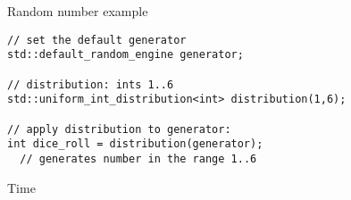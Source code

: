 \begin{block}{Random number example}
  \label{sl:stl:rand16}
\begin{lstlisting}
// set the default generator
std::default_random_engine generator;

// distribution: ints 1..6
std::uniform_int_distribution<int> distribution(1,6);

// apply distribution to generator:
int dice_roll = distribution(generator);
  // generates number in the range 1..6 
\end{lstlisting}
\end{block}

 {Time}

